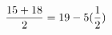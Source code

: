 \documentclass[preview]{standalone}
\begin{document}
\begin{align*}
\special{dvisvgm:raw <g id='unique000'>}\frac{15 + 18}{2} = 19 - 5 (\frac{1}{2})\special{dvisvgm:raw </g>}
\end{align*}
\end{document}
